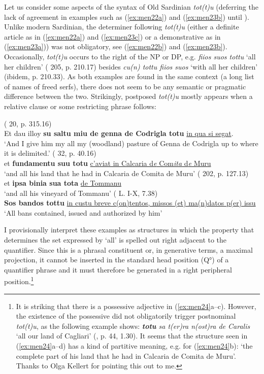 \documentclass[output=paper,colorlinks,citecolor=brown]{langscibook}
\begin{document}
Let us consider some aspects of the syntax of Old Sardinian \textit{tot(t)u} (deferring the lack of agreement in examples such as (\ref{ex:men22a}) and (\ref{ex:men23b}) until ). Unlike modern Sardinian, the determiner following \textit{tot(t)u} (either a definite article as in  (\ref{ex:men22a}) and (\ref{ex:men23c}) or a demonstrative as in (\ref{ex:men23a})) was not obligatory, see  (\ref{ex:men22b}) and (\ref{ex:men23b}). Occasionally, \textit{tot(t)u} occurs to the right of the NP or DP, e.g. \textit{fiios suos tottu} ‘all her children’ ( 205, p. 210.17) besides \textit{cu(n) tottu fiios suos} ‘with all her children’ (ibidem, p. 210.33). As both examples are found in the same context (a long list of names of freed serfs), there does not seem to be any semantic or pragmatic difference between the two. Strikingly, postposed \textit{tot(t)u} mostly appears when a relative clause or some restricting phrase follows:

\ea\label{ex:men24}
\ea ( 20, p. 315.16)\\
Et dau illoy \textbf{su saltu miu de genna de Codrigla totu} \ul{in qua si segat}.\\
‘And I give him my all my (woodland) pasture of Genna de Codrigla up to where it is delimited.’
\ex ( 32, p. 40.16)\\
et \textbf{fundamentu suu totu} \ul{c'aviat in Calcaria d\textit{e} Com\textit{ita} d\textit{e} Muru}\\
‘and all his land that he had in Calcaria de Comita de Muru’
\ex ( 202, p. 127.13)\\
et \textbf{ipsa binia sua tota} \ul{de Tommanu}\\
‘and all his vineyard of Tommanu’
\ex ( L. I-X, 7.38)\\
\textbf{Sos bandos tottu} \ul{in custu breve c(on)tentos, missos (et) ma(n)datos p(er) issu}\\
‘All bans contained, issued and authorized by him’
\z
\z

I provisionally interpret these examples as structures in which the property that determines the set expressed by ‘all’ is spelled out right adjacent to the quantifier. Since this is a phrasal constituent or, in generative terms, a maximal projection, it cannot be inserted in the standard head position (Q°) of a quantifier phrase and it must therefore be generated in a right peripheral position.\footnote{It is striking that there is a possessive adjective in (\ref{ex:men24}a--c). However, the existence of the possessive did not obligatorily trigger postnominal \textit{tot(t)u}, as the following example shows: \textit{\textbf{totu} sa t(er)ra n(ost)ra de Caralis} ‘all our land of Cagliari’ (, p. 44, 1.30). It seems that the structure seen in (\ref{ex:men24}a--d) has a kind of partitive meaning, e.g. for (\ref{ex:men24}b): ‘the complete part of his land that he had in Calcaria de Comita de Muru’. Thanks to Olga Kellert for pointing this out to me.}
\end{document}

